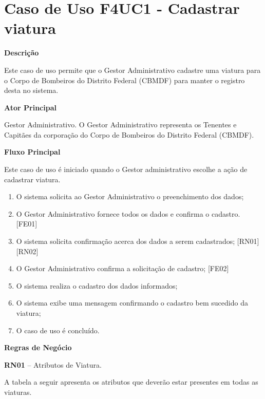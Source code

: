 
  \section{Caso de Uso F4UC1 - Cadastrar viatura}

  {\raggedright
      \textbf{Descrição}
  }

Este caso de uso permite que o Gestor Administrativo cadastre uma viatura para  o Corpo de Bombeiros do 
Distrito Federal (CBMDF)  para manter o registro desta no sistema. 
    
  {\raggedright
      \textbf{Ator Principal}
  }

    Gestor Administrativo. O Gestor Administrativo representa os Tenentes e Capitães da corporação do Corpo de Bombeiros do Distrito
    Federal (CBMDF).

  {\raggedright
      \textbf{Fluxo Principal}
  }
  
Este caso de uso é iniciado quando o Gestor administrativo escolhe a ação de cadastrar viatura.    
  
  \begin{enumerate}

 \item O sistema solicita ao Gestor Administrativo o preenchimento dos dados;
 \item O Gestor Administrativo fornece todos os dados e confirma o cadastro. [FE01]
 \item O sistema solicita confirmação acerca dos dados a serem cadastrados; [RN01][RN02]
 \item O Gestor Administrativo confirma a solicitação de cadastro; [FE02]
 \item O sistema realiza o cadastro dos dados informados;
 \item O sistema exibe uma mensagem confirmando o cadastro bem sucedido da viatura;
 \item O caso de uso é concluído.
    
  \end{enumerate}
  
  \vfill
  \pagebreak
  
   {\raggedright
      \textbf{Regras de Negócio}
   }
   
   \textbf{RN01} – Atributos de Viatura.
   
 A tabela a seguir apresenta os atributos que deverão estar presentes em todas as viaturas.
 
